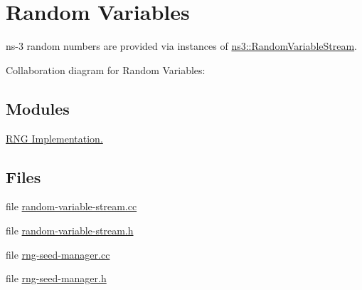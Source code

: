 \hypertarget{group__randomvariable}{}\section{Random Variables}
\label{group__randomvariable}


ns-\/3 random numbers are provided via instances of \hyperlink{classns3_1_1RandomVariableStream}{ns3\+::\+Random\+Variable\+Stream}.  


Collaboration diagram for Random Variables\+:
\subsection*{Modules}
\begin{DoxyCompactItemize}
\item 
\hyperlink{group__rngimpl}{R\+N\+G Implementation.}
\end{DoxyCompactItemize}
\subsection*{Files}
\begin{DoxyCompactItemize}
\item 
file \hyperlink{random-variable-stream_8cc}{random-\/variable-\/stream.\+cc}
\item 
file \hyperlink{random-variable-stream_8h}{random-\/variable-\/stream.\+h}
\item 
file \hyperlink{rng-seed-manager_8cc}{rng-\/seed-\/manager.\+cc}
\item 
file \hyperlink{rng-seed-manager_8h}{rng-\/seed-\/manager.\+h}
\end{DoxyCompactItemize}
